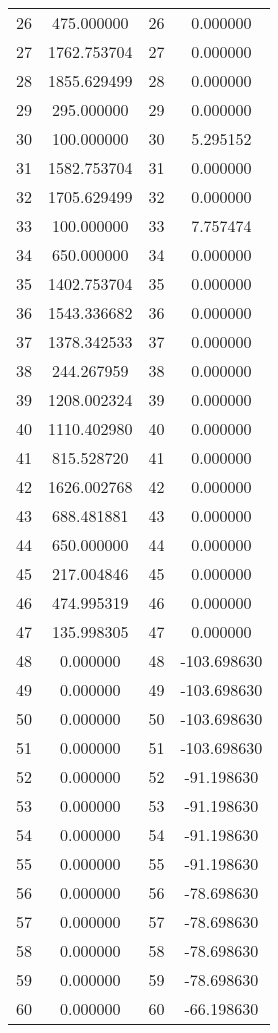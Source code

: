 \documentclass[12pt]{article}
\begin{document}
\begin{longtable}{@{}cccc@{}}
26 & 475.000000 & 26 & 0.000000 \\
27 & 1762.753704 & 27 & 0.000000 \\
28 & 1855.629499 & 28 & 0.000000 \\
29 & 295.000000 & 29 & 0.000000 \\
30 & 100.000000 & 30 & 5.295152 \\
31 & 1582.753704 & 31 & 0.000000 \\
32 & 1705.629499 & 32 & 0.000000 \\
33 & 100.000000 & 33 & 7.757474 \\
34 & 650.000000 & 34 & 0.000000 \\
35 & 1402.753704 & 35 & 0.000000 \\
36 & 1543.336682 & 36 & 0.000000 \\
37 & 1378.342533 & 37 & 0.000000 \\
38 & 244.267959 & 38 & 0.000000 \\
39 & 1208.002324 & 39 & 0.000000 \\
40 & 1110.402980 & 40 & 0.000000 \\
41 & 815.528720 & 41 & 0.000000 \\
42 & 1626.002768 & 42 & 0.000000 \\
43 & 688.481881 & 43 & 0.000000 \\
44 & 650.000000 & 44 & 0.000000 \\
45 & 217.004846 & 45 & 0.000000 \\
46 & 474.995319 & 46 & 0.000000 \\
47 & 135.998305 & 47 & 0.000000 \\
48 & 0.000000 & 48 & -103.698630 \\
49 & 0.000000 & 49 & -103.698630 \\
50 & 0.000000 & 50 & -103.698630 \\
51 & 0.000000 & 51 & -103.698630 \\
52 & 0.000000 & 52 & -91.198630 \\
53 & 0.000000 & 53 & -91.198630 \\
54 & 0.000000 & 54 & -91.198630 \\
55 & 0.000000 & 55 & -91.198630 \\
56 & 0.000000 & 56 & -78.698630 \\
57 & 0.000000 & 57 & -78.698630 \\
58 & 0.000000 & 58 & -78.698630 \\
59 & 0.000000 & 59 & -78.698630 \\
60 & 0.000000 & 60 & -66.198630 \\

\end{longtable}
\end{document}
